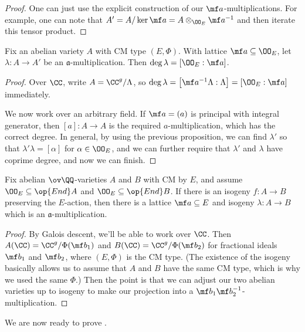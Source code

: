 \documentclass[../notes.tex]{subfiles}
\begin{document}
\begin{proof}
	One can just use the explicit construction of our $\mf a$-multiplications. For example, one can note that $A'=A/\ker\mf a=A\otimes_{\OO_E}\mf a^{-1}$ and then iterate this tensor product.
\end{proof}
\begin{proposition} \label{prop:deg-of-mult}
	Fix an abelian variety $A$ with CM type $(E,\Phi)$. With lattice $\mf a\subseteq\OO_E$, let $\lambda\colon A\to A'$ be an $\mathfrak a$-multiplication. Then $\deg\lambda=[\OO_E:\mf a]$.
\end{proposition}
\begin{proof}
	Over $\CC$, write $A=\CC^g/\Lambda$, so $\deg\lambda=\left[\mf a^{-1}\Lambda:\Lambda\right]=[\OO_E:\mf a]$ immediately.

	We now work over an arbitrary field. If $\mf a=(a)$ is principal with integral generator, then $[a]\colon A\to A$ is the required $a$-multiplication, which has the correct degree. In general, by using the previous proposition, we can find $\lambda'$ so that $\lambda'\lambda=[\alpha]$ for $\alpha\in\OO_E$, and we can further require that $\lambda'$ and $\lambda$ have coprime degree, and now we can finish.
\end{proof}
\begin{proposition} \label{prop:use-isog-to-mult}
	Fix abelian $\ov\QQ$-varieties $A$ and $B$ with CM by $E$, and assume $\OO_E\subseteq\op{End}A$ and $\OO_E\subseteq\op{End}B$. If there is an isogeny $f\colon A\to B$ preserving the $E$-action, then there is a lattice $\mf a\subseteq E$ and isogeny $\lambda\colon A\to B$ which is an $\mathfrak a$-multiplication.
\end{proposition}
\begin{proof}
	By Galois descent, we'll be able to work over $\CC$. Then $A(\CC)=\CC^g/\Phi(\mf b_1)$ and $B(\CC)=\CC^g/\Phi(\mf b_2)$ for fractional ideals $\mf b_1$ and $\mf b_2$, where $(E,\Phi)$ is the CM type. (The existence of the isogeny basically allows us to assume that $A$ and $B$ have the same CM type, which is why we used the same $\Phi$.) Then the point is that we can adjust our two abelian varieties up to isogeny to make our projection into a $\mf b_1\mf b_2^{-1}$-multiplication.
\end{proof}
We are now ready to prove .
\end{document}
